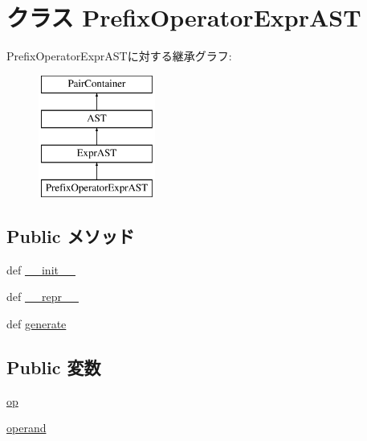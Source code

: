 \hypertarget{classslicc_1_1ast_1_1OperatorExprAST_1_1PrefixOperatorExprAST}{
\section{クラス PrefixOperatorExprAST}
\label{classslicc_1_1ast_1_1OperatorExprAST_1_1PrefixOperatorExprAST}
}
PrefixOperatorExprASTに対する継承グラフ:\begin{figure}[H]
\begin{center}
\leavevmode
\includegraphics[height=4cm]{classslicc_1_1ast_1_1OperatorExprAST_1_1PrefixOperatorExprAST}
\end{center}
\end{figure}
\subsection*{Public メソッド}
\begin{DoxyCompactItemize}
\item 
def \hyperlink{classslicc_1_1ast_1_1OperatorExprAST_1_1PrefixOperatorExprAST_ac775ee34451fdfa742b318538164070e}{\_\-\_\-init\_\-\_\-}
\item 
def \hyperlink{classslicc_1_1ast_1_1OperatorExprAST_1_1PrefixOperatorExprAST_ad8b9328939df072e4740cd9a63189744}{\_\-\_\-repr\_\-\_\-}
\item 
def \hyperlink{classslicc_1_1ast_1_1OperatorExprAST_1_1PrefixOperatorExprAST_a4555d1cee0dccf3942ea35fe86de2e8e}{generate}
\end{DoxyCompactItemize}
\subsection*{Public 変数}
\begin{DoxyCompactItemize}
\item 
\hyperlink{classslicc_1_1ast_1_1OperatorExprAST_1_1PrefixOperatorExprAST_a99a30df0f2488360cdd46b4b88e5f5f0}{op}
\item 
\hyperlink{classslicc_1_1ast_1_1OperatorExprAST_1_1PrefixOperatorExprAST_ac39fb1c273704df1a4d40c0c585223f3}{operand}
\end{DoxyCompactItemize}


